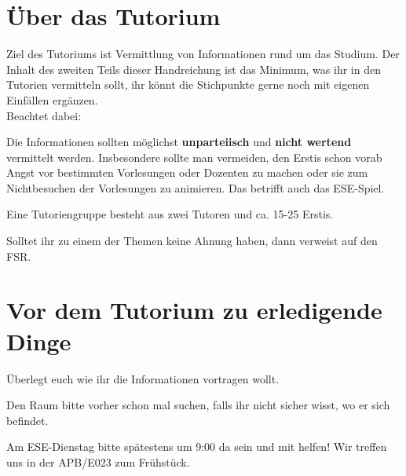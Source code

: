 \documentclass[a4paper,12pt]{report}
\begin{document}
\section{Über das Tutorium}
Ziel des Tutoriums ist Vermittlung von Informationen rund um das Studium. Der Inhalt des zweiten Teils dieser Handreichung ist das Minimum, was ihr in den Tutorien vermitteln sollt, ihr könnt die Stichpunkte gerne noch mit eigenen Einfällen ergänzen.\\
Beachtet dabei:
\begin{itemize*}
\item Die Informationen sollten möglichst \textbf{unparteiisch} und \textbf{nicht wertend} vermittelt werden.
Insbesondere sollte man vermeiden, den Erstis schon vorab Angst vor bestimmten Vorlesungen oder Dozenten zu machen oder sie zum Nichtbesuchen der Vorlesungen zu animieren. Das betrifft auch das ESE-Spiel.
\item Eine Tutoriengruppe besteht aus zwei Tutoren und ca. 15-25 Erstis.
\item Solltet ihr zu einem der Themen keine Ahnung haben, dann verweist auf den FSR.
\end{itemize*}

\section{Vor dem Tutorium zu erledigende Dinge}
\begin{itemize*}
\item Überlegt euch wie ihr die Informationen vortragen wollt.
\item Den Raum bitte vorher schon mal suchen, falls ihr nicht sicher wisst, wo er sich befindet.
\item Am ESE-Dienstag bitte spätestens um 9:00 da sein und mit helfen!
Wir treffen uns in der APB/E023 zum Frühstück.
\end{itemize*}
\end{document}
